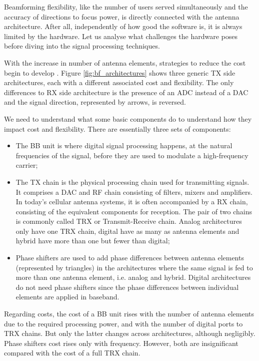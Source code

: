 Beamforming flexibility, like the number of users served simultaneously and the accuracy of directions to focus power, is directly connected with the antenna architecture. After all, independently of how good the software is, it is always limited by the hardware. Let us analyse what challenges the hardware poses before diving into the signal processing techniques.

With the increase in number of antenna elements, strategies to reduce the cost begin to develop \cite{8744505}. Figure \ref{fig:bf_architectures} shows three generic TX side architectures, each with a different associated cost and flexibility. The only differences to \acs{RX} side architecture is the presence of an \ac{ADC} instead of a \ac{DAC} and the signal direction, represented by arrows, is reversed.


We need to understand what some basic components do to understand how they impact cost and flexibility. There are essentially three sets of components:

\begin{itemize}%
    \item The \ac{BB} unit is where digital signal processing happens, at the natural frequencies of the signal, before they are used to modulate a high-frequency carrier;
    \item The \ac{TX} chain is the physical processing chain used for transmitting signals. It comprises a \ac{DAC} and \ac{RF} chain consisting of filters, mixers and amplifiers. In today's cellular antenna systems, it is often accompanied by a \ac{RX} chain, consisting of the equivalent components for reception. The pair of two chains is commonly called \ac{TRX} or Transmit-Receive chain. Analog architectures only have one TRX chain, digital have as many as antenna elements and hybrid have more than one but fewer than digital;
    \item Phase shifters are used to add phase differences between antenna elements (represented by triangles) in the architectures where the same signal is fed to more than one antenna element, i.e. analog and hybrid. Digital architectures do not need phase shifters since the phase differences between individual elements are applied in baseband. 
\end{itemize}

Regarding costs, the cost of a BB unit rises with the number of antenna elements due to the required processing power, and with the number of digital ports to TRX chains. But only the latter changes across architectures, although negligibly. Phase shifters cost rises only with frequency. However, both are insignificant compared with the cost of a full \ac{TRX} chain.

